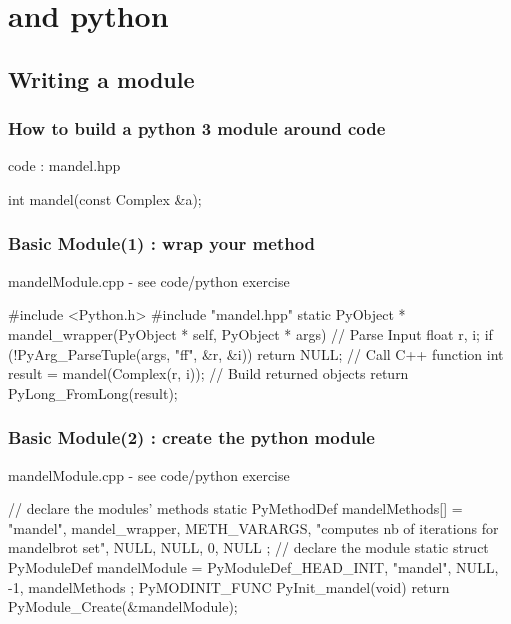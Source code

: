 \section[py]{\cpp and python}

\subsection[module]{Writing a module}

\begin{frame}[fragile]
  \frametitle{How to build a python 3 module around \cpp code}
  \begin{block}{\cpp code : mandel.hpp}
    \begin{cppcode*}{}
      int mandel(const Complex &a);
    \end{cppcode*}
  \end{block}
\end{frame}
  
\begin{frame}[fragile]
  \frametitle{Basic Module(1) : wrap your method}
  \begin{block}{mandelModule.cpp - see code/python exercise}
    \begin{cppcode*}{}
      #include <Python.h>
      #include "mandel.hpp"
      static PyObject * mandel_wrapper(PyObject * self,
                                       PyObject * args) {
        // Parse Input
        float r, i;
        if (!PyArg_ParseTuple(args, "ff", &r, &i))
          return NULL;
        // Call C++ function
        int result = mandel(Complex(r, i));
        // Build returned objects
        return PyLong_FromLong(result);
      }
    \end{cppcode*}
  \end{block}
\end{frame}

\begin{frame}[fragile]
  \frametitle{Basic Module(2) : create the python module}
  \begin{block}{mandelModule.cpp - see code/python exercise}
    \begin{cppcode*}{}
      // declare the modules' methods
      static PyMethodDef mandelMethods[] = {
          {"mandel", mandel_wrapper, METH_VARARGS,
          "computes nb of iterations for mandelbrot set"},
          {NULL, NULL, 0, NULL}
      };
      // declare the module
      static struct PyModuleDef mandelModule = {
        PyModuleDef_HEAD_INIT,
        "mandel", NULL, -1, mandelMethods
      };
      PyMODINIT_FUNC PyInit_mandel(void) {
        return PyModule_Create(&mandelModule);
      }
    \end{cppcode*}
  \end{block}
\end{frame}


